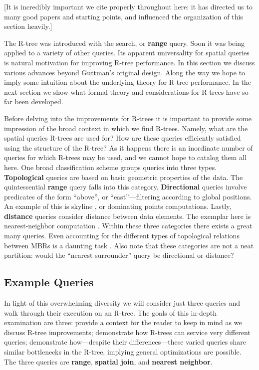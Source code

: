 \newcommand{\keyword}[1]{\textbf{#1}}

[It is incredibly important we cite \cite{thebook} properly throughout here: it has directed us to many good papers and starting points, and influenced the organization of this section heavily.]

The R-tree was introduced with the search, or \keyword{range} query.
Soon it was being applied to a variety of other queries.
Its apparent universality for spatial queries is natural motivation for improving R-tree performance.
In this section we discuss various advances beyond Guttman's original design.
Along the way we hope to imply some intuition about the underlying theory for R-tree performance.
In the next section we show what formal theory and considerations for R-trees have so far been developed.

Before delving into the improvements for R-trees it is important to provide some impression of the broad context in which we find R-trees.
Namely, what are the spatial queries R-trees are used for?
How are these queries efficiently satisfied using the structure of the R-tree?
As it happens there is an inordinate number of queries for which R-trees may be used, and we cannot hope to catalog them all here.
One broad classification scheme groups queries into three types.
\keyword{Topological} queries are based on basic geometric properties of the data.
The quintessential \keyword{range} query falls into this category.
\keyword{Directional} queries involve predicates of the form ``above'', or ``east''---filtering according to global positions.
An example of this is skyline \cite{papadiastaofuseeger05}, or dominating points computations.
Lastly, \keyword{distance} queries consider distance between data elements.
The exemplar here is nearest-neighbor computation \cite{roussopouloskelleyvincent95}.
Within these three categories there exists a great many queries.
Even accounting for the different types of topological relations between MBRs is a daunting task \cite{papadiassellistheodoridisegenhofer95}.
Also note that these categories are not a neat partition: would the ``nearest surrounder'' \cite{leeleeleong10} query be directional or distance?

\subsection{Example Queries}

In light of this overwhelming diversity we will consider just three queries and walk through their execution on an R-tree.
The goals of this in-depth examination are three:
provide a context for the reader to keep in mind as we discuss R-tree improvements;
demonstrate how R-trees can service very different queries;
demonstrate how---despite their differences---these varied queries share similar bottlenecks in the R-tree, implying general optimizations are possible.
The three queries are \keyword{range}, \keyword{spatial join}, and \keyword{nearest neighbor}.

